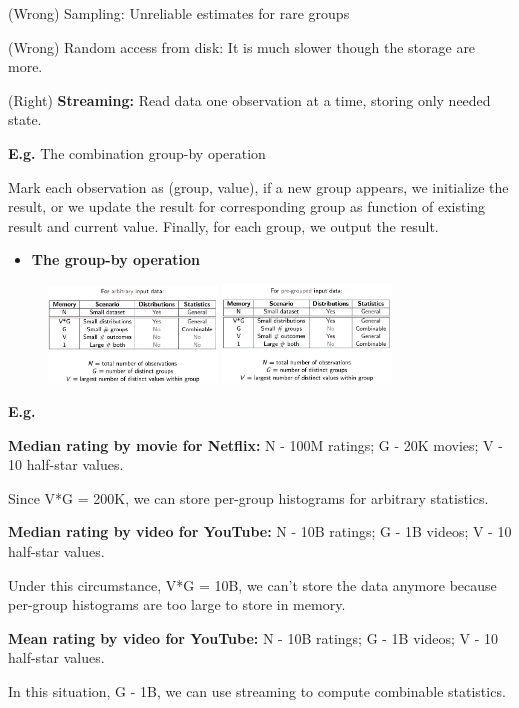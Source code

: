 (Wrong) Sampling: Unreliable estimates for rare groups

(Wrong) Random access from disk: It is much slower though the storage are more.

(Right) \textbf{Streaming:} Read data one observation at a time, storing only needed state.

\textbf{E.g.} The combination group-by operation

Mark each observation as (group, value), if a new group appears, we initialize the result, or we update the result for corresponding group as function of existing result and current value. Finally, for each group, we output the result.

\begin{itemize}
\item \textbf{The group-by operation}
\end{itemize}
\begin{figure}[ht]
  \begin{center}
    \includegraphics[width=0.4\textwidth]{figures/scribe_notes_5.png}
    \includegraphics[width=0.4\textwidth]{figures/scribe_notes_6.png}
    \label{fig:scribe_notes_5_6}
  \end{center}
\end{figure}

\textbf{E.g. }

\textbf{Median rating by movie for Netflix:} N - 100M ratings; G - 20K movies; V - 10 half-star values.

Since V*G = 200K, we can store per-group histograms for arbitrary statistics.

\textbf{Median rating by video for YouTube:} N - 10B ratings; G - 1B videos; V - 10 half-star values.

Under this circumstance, V*G = 10B, we can’t store the data anymore because per-group histograms are too large to store in memory.

\textbf{Mean rating by video for YouTube:} N - 10B ratings; G - 1B videos; V - 10 half-star values.

In this situation, G - 1B, we can use streaming to compute combinable statistics.
                                                                              


